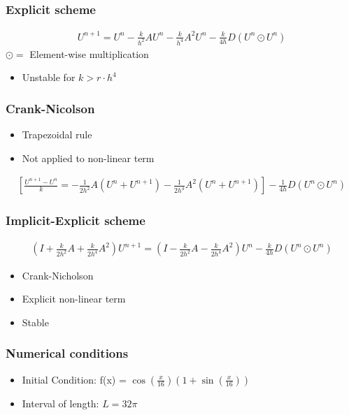 \documentclass[screen]{beamer}
\begin{document}
\begin{frame}
\frametitle{Explicit scheme}
\flushright

\begin{align*}
U^{n+1} = U^n - \frac{k}{h^2}AU^n - \frac{k}{h^4}A^2U^n - \frac{k}{4h}D(U^{n}\odot U^n)
\end{align*}
$\odot =$ Element-wise multiplication
\begin{itemize}
\item Unstable for $k > r \cdot h^4$

\end{itemize}
\end{frame}


\begin{frame}
\frametitle{Crank-Nicolson}
\begin{itemize}
\normalsize
\item Trapezoidal rule
\item Not applied to non-linear term
\end{itemize}
\small
\begin{align*}
 \left[\frac{U^{n+1} - U^n}{k} =
- \frac{1}{2h^2}A(U^n+U^{n+1}) - \frac{1}{2h^4}A^2(U^n + U^{n+1}) \right] - \frac{1}{4h}D(U^{n}\odot U^n)
\end{align*}

\end{frame}


\begin{frame}
\frametitle{Implicit-Explicit scheme}
\begin{align*}
(I + \frac{k}{2h^2}A + \frac{k}{2h^4}A^2)U^{n+1}
= (I - \frac{k}{2h^2}A - \frac{k}{2h^4}A^2)U^n - \frac{k}{4h}D(U^{n}\odot U^n)
\end{align*}

\begin{itemize}
\item Crank-Nicholson
\item Explicit non-linear term
\item Stable
\end{itemize}

\end{frame}

\begin{frame}
\frametitle{Numerical conditions}
\begin{itemize}
\item Initial Condition: f(x) = $\cos(\frac{x}{16})(1+\sin(\frac{x}{16}))$
\item Interval of length: $L = 32\pi$
\end{itemize}
\end{frame}
\end{document}
